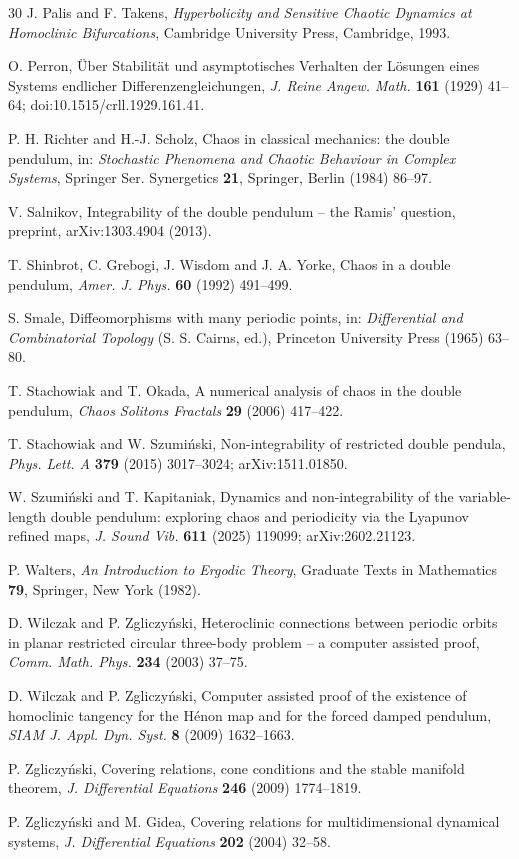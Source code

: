 \documentclass[11pt]{article}
\theoremstyle{definition}
\begin{document}
\begin{thebibliography}{30}
 J. Palis and F. Takens, \emph{Hyperbolicity and Sensitive Chaotic Dynamics at Homoclinic Bifurcations}, Cambridge University Press, Cambridge, 1993.

 O. Perron, \"Uber Stabilit\"at und asymptotisches Verhalten der L\"osungen eines Systems endlicher Differenzengleichungen, \emph{J. Reine Angew. Math.} \textbf{161} (1929) 41--64; doi:10.1515/crll.1929.161.41.

 P. H. Richter and H.-J. Scholz, Chaos in classical mechanics: the double pendulum, in: \emph{Stochastic Phenomena and Chaotic Behaviour in Complex Systems}, Springer Ser. Synergetics \textbf{21}, Springer, Berlin (1984) 86--97.

 V. Salnikov, Integrability of the double pendulum -- the Ramis' question, preprint, arXiv:1303.4904 (2013).

 T. Shinbrot, C. Grebogi, J. Wisdom and J. A. Yorke, Chaos in a double pendulum, \emph{Amer. J. Phys.} \textbf{60} (1992) 491--499.

 S. Smale, Diffeomorphisms with many periodic points, in: \emph{Differential and Combinatorial Topology} (S. S. Cairns, ed.), Princeton University Press (1965) 63--80.

 T. Stachowiak and T. Okada, A numerical analysis of chaos in the double pendulum, \emph{Chaos Solitons Fractals} \textbf{29} (2006) 417--422.

 T. Stachowiak and W. Szumi\'nski, Non-integrability of restricted double pendula, \emph{Phys. Lett. A} \textbf{379} (2015) 3017--3024; arXiv:1511.01850.

 W. Szumi\'nski and T. Kapitaniak, Dynamics and non-integrability of the variable-length double pendulum: exploring chaos and periodicity via the Lyapunov refined maps, \emph{J. Sound Vib.} \textbf{611} (2025) 119099; arXiv:2602.21123.

 P. Walters, \emph{An Introduction to Ergodic Theory}, Graduate Texts in Mathematics \textbf{79}, Springer, New York (1982).

 D. Wilczak and P. Zgliczy\'nski, Heteroclinic connections between periodic orbits in planar restricted circular three-body problem -- a computer assisted proof, \emph{Comm. Math. Phys.} \textbf{234} (2003) 37--75.

 D. Wilczak and P. Zgliczy\'nski, Computer assisted proof of the existence of homoclinic tangency for the H\'enon map and for the forced damped pendulum, \emph{SIAM J. Appl. Dyn. Syst.} \textbf{8} (2009) 1632--1663.

 P. Zgliczy\'nski, Covering relations, cone conditions and the stable manifold theorem, \emph{J. Differential Equations} \textbf{246} (2009) 1774--1819.

 P. Zgliczy\'nski and M. Gidea, Covering relations for multidimensional dynamical systems, \emph{J. Differential Equations} \textbf{202} (2004) 32--58.

\end{thebibliography}
\end{document}
